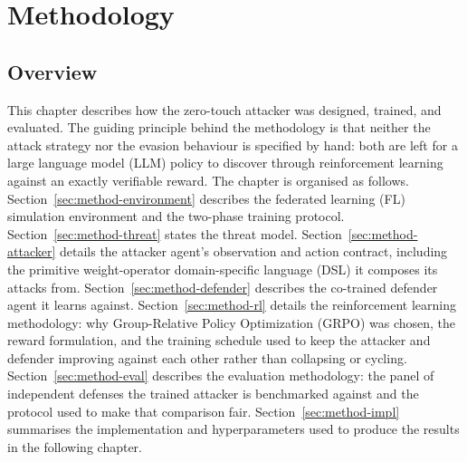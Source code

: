 
\chapter{Methodology}
\label{ch:methodology}

\section{Overview}
\label{sec:method-overview}

This chapter describes how the zero-touch attacker was designed, trained, and evaluated. The guiding principle behind the methodology is that neither the attack strategy nor the evasion behaviour is specified by hand: both are left for a large language model (LLM) policy to discover through reinforcement learning against an exactly verifiable reward. The chapter is organised as follows. Section~\ref{sec:method-environment} describes the federated learning (FL) simulation environment and the two-phase training protocol. Section~\ref{sec:method-threat} states the threat model. Section~\ref{sec:method-attacker} details the attacker agent's observation and action contract, including the primitive weight-operator domain-specific language (DSL) it composes its attacks from. Section~\ref{sec:method-defender} describes the co-trained defender agent it learns against. Section~\ref{sec:method-rl} details the reinforcement learning methodology: why Group-Relative Policy Optimization (GRPO) was chosen, the reward formulation, and the training schedule used to keep the attacker and defender improving against each other rather than collapsing or cycling. Section~\ref{sec:method-eval} describes the evaluation methodology: the panel of independent defenses the trained attacker is benchmarked against and the protocol used to make that comparison fair. Section~\ref{sec:method-impl} summarises the implementation and hyperparameters used to produce the results in the following chapter.

